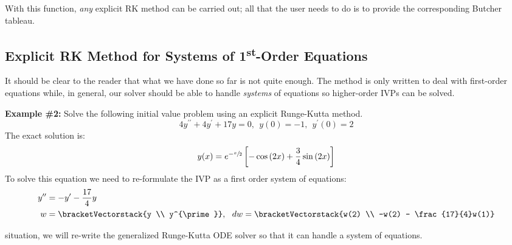 With this function, \emph{any} explicit RK method can be carried out; all that the user needs to do is to provide the corresponding Butcher tableau.

\subsection{Explicit RK Method for Systems of 1\textsuperscript{st}-Order Equations}

It should be clear to the reader that what we have done so far is not quite enough.  The method is only written to deal with first-order equations while, in general, our solver should be able to handle \emph{systems} of equations so higher-order IVPs can be solved.

\vspace{0.25cm}

\noindent\textbf{Example \#2:} Solve the following initial value problem using an explicit Runge-Kutta method.
\begin{equation*}
4y^{\prime \prime} + 4y^{\prime} + 17y = 0, \ \ y(0)=-1, \ \ y^{\prime}(0) = 2
\end{equation*}
The exact solution is:
\begin{equation*}
y(x) = e^{-\sfrac{x}{2}}\left[-\cos{(2x)} + \frac{3}{4}\sin{(2x)} \right]
\end{equation*}
To solve this equation we need to re-formulate the IVP as a first order system of equations:
\begin{align*}
y^{\prime \prime} &= -y^{\prime} - \frac{17}{4}y \\
w &= \bracketVectorstack{y \\ y^{\prime}}, \ \ dw = \bracketVectorstack{w(2) \\ -w(2) - \frac{17}{4}w(1)}
\end{align*}

 situation, we will re-write the generalized Runge-Kutta ODE solver so that it can handle a system of equations.


